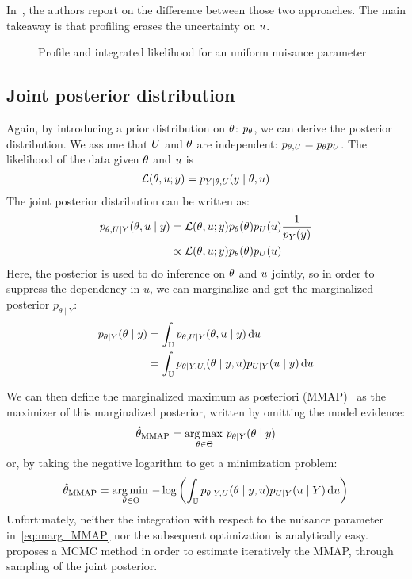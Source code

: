 \documentclass[../../Main_ManuscritThese.tex]{subfiles}
\newcommand\imgpath{/home/victor/acadwriting/Manuscrit/Text/Chapter3/img/}
\begin{document}
In~\cite{berger_integrated_1999}, the authors report on the difference between those two approaches. The main takeaway is that profiling erases the uncertainty on $u$.
\begin{figure}[ht]
  \centering
  
  \caption{\label{fig:profile_integrated_lik} Profile and integrated likelihood for an uniform nuisance parameter}
\end{figure}


\subsection{Joint posterior distribution}
Again, by introducing a prior distribution on $\theta$: $p_{\theta}$, we can derive the posterior distribution. We assume that $U$ and $\theta$ are independent: $p_{\theta, U} = p_{\theta}p_{U}$.
The likelihood of the data given $\theta$ and $u$ is
\begin{equation}
  \mathcal{L}(\theta,u;y) = p_{Y \mid \theta, U}(y\mid \theta,u)
\end{equation}
The joint posterior distribution can be written as:
\begin{align}
  p_{\theta,U \mid Y}(\theta,u \mid y) &= \mathcal{L}(\theta,u;y)p_{\theta}(\theta)p_{U}(u) \frac{1}{p_Y(y)} \\
  &\propto \mathcal{L}(\theta,u;y)p_{\theta}(\theta)p_{U}(u)
\end{align}
Here, the posterior is used to do inference on $\theta$ and $u$ jointly, so in order to suppress the dependency in $u$, we can marginalize and get the marginalized posterior $p_{\theta \mid Y}$:
\begin{align}
  p_{\theta \mid Y}(\theta \mid y) &= \int_{\mathbb{U}} p_{\theta,U\mid Y}(\theta,u\mid y)\,\mathrm{d}u \label{eq:marg_MMAP}\\
                             &= \int_{\mathbb{U}}p_{\theta \mid Y, U,}(\theta \mid y, u) p_{U\mid Y}(u \mid y)\,\mathrm{d}u
\end{align}

We can then define the marginalized maximum as posteriori (MMAP)~\cite{doucet_marginal_2002} as the  maximizer of this marginalized posterior, written by omitting the model evidence:
\begin{equation}
  \label{eq:def_MMAP}
  \hat{\theta}_{\mathrm{MMAP}} = \operatorname*{arg\,max \,}_{\theta\in\Theta} p_{\theta \mid Y}(\theta\mid y)
\end{equation}
or, by taking the negative logarithm to get a minimization problem:
\begin{equation}
\hat{\theta}_{\mathrm{MMAP}} = \operatorname*{arg\,min \,}_{\theta\in\Theta} -\log \left(\int_{\mathbb{U}} p_{\theta\mid Y,U}(\theta\mid y, u) p_{U \mid Y}(u \mid Y)\,\mathrm{d}u \right)
\end{equation}
Unfortunately, neither the integration with respect to the nuisance parameter in~\eqref{eq:marg_MMAP} nor the subsequent optimization is analytically easy. \cite{doucet_marginal_2002} proposes a MCMC method in order to estimate iteratively the MMAP, through sampling of the joint posterior.
\end{document}
